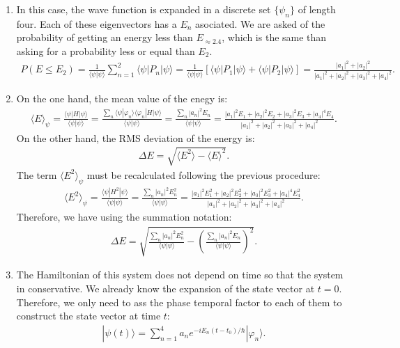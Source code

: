 \documentclass[letterpaper,11pt,twoside]{article}
\newcommand{\ket}[1]{|#1\rangle}
\newcommand{\braket}[1]{\langle#1\rangle}
\begin{document}
\begin{enumerate}[itemsep=0pt,topsep=0pt,label=\alph*.]
  \item In this case, the wave function is expanded in a discrete set $\{\psi_n\}$ of length four. Each of these eigenvectors has a $E_n$
  asociated. We are asked of the probability of getting an energy less than $E_{\approx2.4}$, which is the same than asking for a probability 
  less or equal than $E_2$.
  \begin{align*}
    P(E\leq E_2)=\frac{1}{\braket{\psi|\psi}}\sum_{n=1}^2\braket{\psi|P_n|\psi}=\frac{1}{\braket{\psi|\psi}}\left[\braket{\psi|P_1|\psi}+\braket{\psi|P_2|\psi}\right]=\frac{|a_1|^2+|a_2|^2}{|a_1|^2+|a_2|^2+|a_3|^2+|a_4|^2}.
  \end{align*}
  \item On the one hand, the mean value of the enegy is:
  \begin{align*}
    \braket{E}_\psi=\frac{\braket{\psi|H|\psi}}{\braket{\psi|\psi}}=\frac{\sum_n\braket{\psi|\varphi_n}\braket{\varphi_n|H|\psi}}{\braket{\psi|\psi}}=\frac{\sum_n|a_n|^2E_n}{\braket{\psi|\psi}}=\frac{|a_1|^2E_1+|a_2|^2E_2+|a_3|^2E_3+|a_4|^4E_4}{|a_1|^2+|a_2|^2+|a_3|^2+|a_4|^2}.
  \end{align*}
  On the other hand, the RMS deviation of the energy is:
  \begin{align*}
    \Delta E=\sqrt{\braket{E^2}-\braket{E}^2}.
  \end{align*}
  The term $\braket{E^2}_\psi$ must be recalculated following the previous procedure:
  \begin{align*}
    \braket{E^2}_\psi=\frac{\braket{\psi|H^2|\psi}}{\braket{\psi|\psi}}=\frac{\sum_n|a_n|^2E^2_n}{\braket{\psi|\psi}}=\frac{|a_1|^2E^2_1+|a_2|^2E^2_2+|a_3|^2E^2_3+|a_4|^4E^2_4}{|a_1|^2+|a_2|^2+|a_3|^2+|a_4|^2}.
  \end{align*}
  Therefore, we have using the summation notation:
  \begin{align*}
    \Delta E=\sqrt{\frac{\sum_n|a_n|^2E^2_n}{\braket{\psi|\psi}}-\left(\frac{\sum_n|a_n|^2E_n}{\braket{\psi|\psi}}\right)^2}.
  \end{align*}
  \item The Hamiltonian of this system does not depend on time so that the system in conservative. We already know the expansion of the state vector at $t=0$. Therefore, we only need to ass the phase temporal 
  factor to each of them to construct the state vector at time $t$:
  \begin{align*}
    \ket{\psi(t)}=\sum_{n=1}^4a_ne^{-iE_n(t-t_0)/\hbar}\ket{\varphi_n}.

\end{align*}
\end{enumerate}
\end{document}
